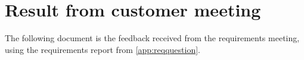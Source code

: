 \chapter{Result from customer meeting}\label{app:reqanswer}

The following document is the feedback received from the requirements meeting, using the requirements report from \ref{app:reqquestion}.

